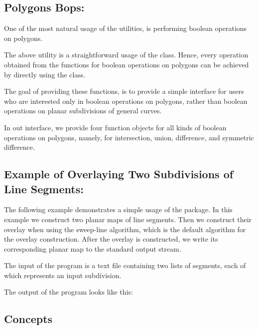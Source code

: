 \begin{ccTexOnly}
\subsection*{Polygons Bops:}
One of the most natural usage of 
the  utilities, 
is performing boolean operations on polygons.

The above utility is a straightforward usage of the 
class. Hence, every operation obtained from the functions 
for boolean operations on polygons can be achieved by 
directly using the  
class. 

The goal of providing these functions, is to 
provide a simple interface for users who are 
interested only in boolean operations on 
polygons, rather than boolean operations 
on planar subdivisions of general curves.

In out interface, we provide four function objects 
for all kinds of boolean operations on polygons,
namely, for intersection, union, difference, and 
symmetric difference.

\subsection*{Example of Overlaying Two Subdivisions of Line Segments:}
The following example demonstrates a simple usage of the 
 package.
In this example we construct two planar maps of line segments. 
Then we construct their overlay when using the sweep-line algorithm, which is 
the default algorithm for the overlay construction. 
After the overlay is constructed, 
we write its corresponding planar map to the 
standard output stream.

The input of the program is a text file containing two lists of segments, 
each of which represents an input subdivision.

The output of the program looks like this:

\subsection*{Concepts}
\\
\\
\\
\\
\\
\\
\\


\end{ccTexOnly}
